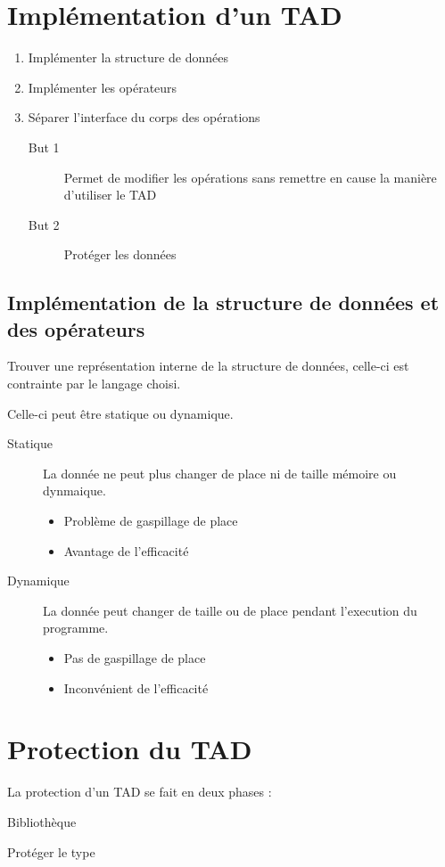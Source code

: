 \section{Implémentation d'un TAD}
\begin{enumerate}
	\item Implémenter la structure de données
	\item Implémenter les opérateurs
	\item Séparer l'interface du corps des opérations
		\begin{description}
			\item[But 1] Permet de modifier les opérations sans remettre en cause la manière d'utiliser le TAD
			\item[But 2] Protéger les données
		\end{description}
\end{enumerate}

\subsection{Implémentation de la structure de données et des opérateurs}
Trouver une représentation interne de la structure de données, celle-ci est contrainte par le langage choisi.

Celle-ci peut être statique ou dynamique.
\begin{description}
	\item[Statique] La donnée ne peut plus changer de place ni de taille mémoire ou dynmaique.
		\begin{itemize}
			\item Problème de gaspillage de place
			\item Avantage de l'efficacité
		\end{itemize}
	\item[Dynamique] La donnée peut changer de taille ou de place pendant l'execution du programme.
		\begin{itemize}
			\item Pas de gaspillage de place
			\item Inconvénient de l'efficacité
		\end{itemize}
\end{description}

\section{Protection du TAD}
La protection d'un TAD se fait en deux phases : 
\begin{description}
	\item[séparer corps - interface] Bibliothèque 
	\item Protéger le type
\end{description}

